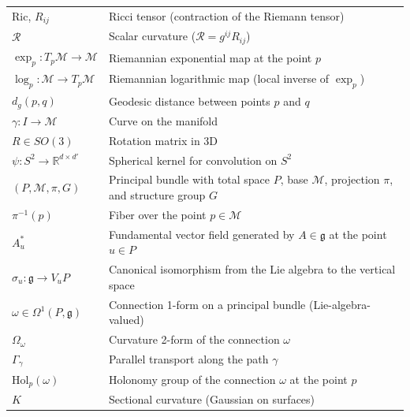 \begin{longtable}{>{\centering\arraybackslash}p{}p{}}
$\mathrm{Ric}$, $R_{ij}$ & Ricci tensor (contraction of the Riemann tensor) \\
$\mathcal{R}$ & Scalar curvature ($\mathcal{R} = g^{ij}R_{ij}$) \\
$\exp_p: T_p\mathcal{M} \to \mathcal{M}$ & Riemannian exponential map at the point $p$ \\
$\log_p: \mathcal{M} \to T_p\mathcal{M}$ & Riemannian logarithmic map (local inverse of $\exp_p$) \\
$d_g(p,q)$ & Geodesic distance between points $p$ and $q$ \\
$\gamma: I \to \mathcal{M}$ & Curve on the manifold \\
$R \in SO(3)$ & Rotation matrix in 3D \\
$\psi: S^2 \rightarrow \mathbb{R}^{d \times d'}$ & Spherical kernel for convolution on $S^2$ \\
$(P, \mathcal{M}, \pi, G)$ & Principal bundle with total space $P$, base $\mathcal{M}$, projection $\pi$, and structure group $G$ \\
$\pi^{-1}(p)$ & Fiber over the point $p \in \mathcal{M}$ \\
$A^*_u$ & Fundamental vector field generated by $A \in \mathfrak{g}$ at the point $u \in P$ \\
$\sigma_u: \mathfrak{g} \to V_u P$ & Canonical isomorphism from the Lie algebra to the vertical space \\
$\omega \in \Omega^1(P, \mathfrak{g})$ & Connection 1-form on a principal bundle (Lie-algebra-valued) \\
$\Omega_\omega$ & Curvature 2-form of the connection $\omega$ \\
$\Gamma_\gamma$ & Parallel transport along the path $\gamma$ \\
$\text{Hol}_p(\omega)$ & Holonomy group of the connection $\omega$ at the point $p$ \\
$K$ & Sectional curvature (Gaussian on surfaces) \\
\end{longtable}

